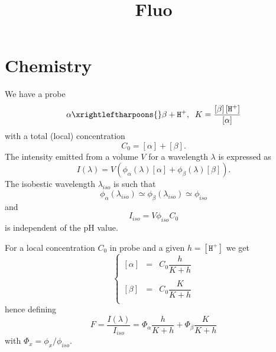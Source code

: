 \documentclass[aps]{revtex4}
\newcommand{\mychem}[1]{\mathtt{#1}}
\newcommand{\myconc}[1]{\left\lbrack{#1}\right\rbrack}
\newcommand{\plus}{\mychem{+}}
\newcommand{\proton}{\mychem{H}^\plus}
\begin{document}
\title{Fluo}
\maketitle

\section{Chemistry}
We have a probe
\begin{equation}
	\alpha \xrightleftharpoons{} \beta + \proton, \;\; K = \dfrac{\myconc{\beta}\myconc{\proton}}{ \myconc{\alpha} }
\end{equation}
with a total (local) concentration 
\begin{equation}
C_0 = \myconc{\alpha} + \myconc{\beta}.
\end{equation}
The intensity emitted from a volume $V$ for a wavelength $\lambda$ is expressed as
\begin{equation}
	I(\lambda) = V \left( \phi_\alpha(\lambda) \myconc{\alpha}  + \phi_\beta(\lambda) \myconc{\beta} \right).
\end{equation}
The isobestic wavelength $\lambda_{iso}$  is such that 
\begin{equation}
	\phi_\alpha(\lambda_{iso}) \simeq \phi_\beta(\lambda_{iso}) \simeq \phi_{iso}
\end{equation}
and
\begin{equation}
	I_{iso} = V  \phi_{iso} C_0
\end{equation}
is independent of the pH value.

For a local concentration $C_0$ in probe and a given $h=\myconc{\proton}$ we get
\begin{equation}
\left\lbrace
\begin{array}{rcl}
	 \myconc{\alpha}  & = & C_0 \dfrac{h}{K+h}\\
	 \\
	 \myconc{\beta}   & = & C_0 \dfrac{K}{K+h}\\
\end{array}
\right.
\end{equation}
hence defining
\begin{equation}
	F = \dfrac{I(\lambda)}{I_{iso}} = \Phi_\alpha \dfrac{h}{K+h} + \Phi_\beta \dfrac{K}{K+h}
\end{equation}
with $\Phi_x = \phi_x/\phi_{iso}$.
\end{document}
